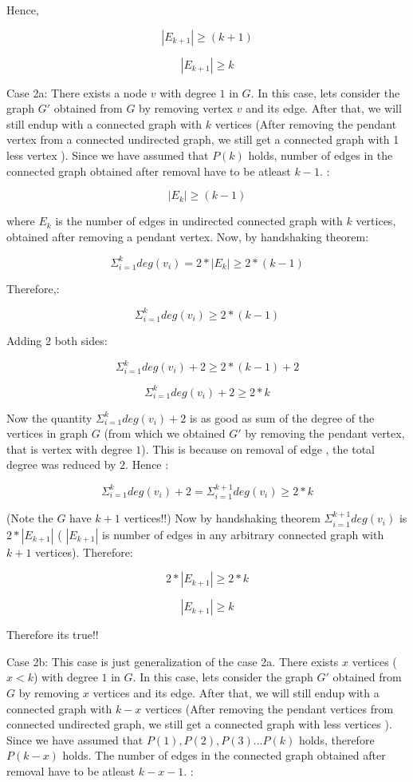 \documentclass[answers]{exam}
\begin{document}
\begin{questions}
\begin{solution}
Hence,

$$|E_{k+1}| \geq(k+1)$$

$$|E_{k+1}| \geq k$$



Case 2a: There exists a node $v$ with degree $1$ in $G$. In this case, lets consider the graph $G'$ obtained from $G$ by removing vertex $v$ and its edge. After that, we will still endup with a connected graph with $k$ vertices (After removing the pendant vertex from a connected undirected graph, we still get a connected graph with 1 less vertex ). Since we have assumed that $P(k)$ holds, number of edges in the connected graph obtained after removal have to be atleast $k-1$. :

$$|E_k|\geq(k-1)$$

where $E_k$ is the number of edges in undirected connected graph with $k$ vertices, obtained after removing a pendant vertex. Now, by handshaking theorem:

$$\Sigma_{i=1}^k deg(v_i) =2*|E_k|\geq2*(k-1)$$

Therefore,:

$$\Sigma_{i=1}^k deg(v_i) \geq2*(k-1)$$

Adding $2$ both sides:

$$\Sigma_{i=1}^k deg(v_i) +2\geq2*(k-1)+2$$

$$\Sigma_{i=1}^k deg(v_i) +2\geq2*k$$

Now the quantity $\Sigma_{i=1}^k deg(v_i) +2$ is as good as sum of the degree of the vertices in graph $G$ (from which we obtained $G'$ by removing the pendant vertex, that is vertex with degree $1$). This is because on removal of edge , the total degree was reduced by $2$. Hence :

$$\Sigma_{i=1}^k deg(v_i) +2=\Sigma_{i=1}^{k+1} deg(v_i)\geq2*k$$

(Note the $G$ have $k+1$ vertices!!)
Now by handshaking theorem $\Sigma_{i=1}^{k+1} deg(v_i)$ is $2*|E_{k+1}|$ ( $|E_{k+1}|$ is number of edges in any arbitrary connected graph with $k+1$ vertices). Therefore:

$$2*|E_{k+1}|\geq2*k$$

$$|E_{k+1}|\geq k$$  

Therefore its true!!

Case 2b: This case is just generalization of the case 2a. There exists $x$ vertices ($x<k$) with degree $1$ in $G$. In this case, lets consider the graph $G'$ obtained from $G$ by removing $x$ vertices and its edge. After that, we will still endup with a connected graph with $k-x$ vertices (After removing the pendant vertices from connected undirected graph, we still get a connected graph with less vertices ). Since we have assumed that $P(1),P(2),P(3)...P(k)$ holds, therefore $P(k-x)$ holds. The number of edges in the connected graph obtained after removal have to be atleast $k-x-1$. :


\end{solution}
\end{questions}
\end{document}

